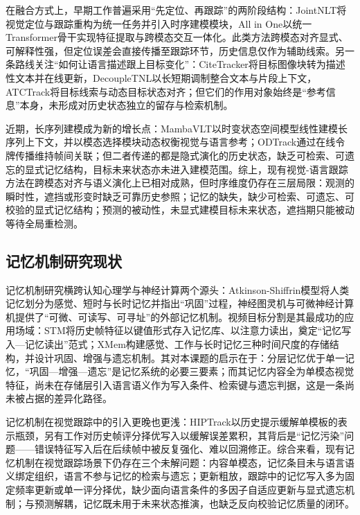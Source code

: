 在融合方式上，早期工作普遍采用“先定位、再跟踪”的两阶段结构：JointNLT\cite{zhou2023jointnlt}将视觉定位与跟踪重构为统一任务并引入时序建模模块，All in One\cite{zhang2023allinone}以统一Transformer骨干实现特征提取与跨模态交互一体化。此类方法跨模态对齐显式、可解释性强，但定位误差会直接传播至跟踪环节，历史信息仅作为辅助线索。另一条路线关注“如何让语言描述跟上目标变化”：CiteTracker\cite{li2023citetracker}将目标图像块转为描述性文本并在线更新，DecoupleTNL\cite{ma2023decouple}以长短期调制整合文本与片段上下文，ATCTrack\cite{feng2025atctrack}将目标线索与动态目标状态对齐；但它们的作用对象始终是“参考信息”本身，未形成对历史状态独立的留存与检索机制。

近期，长序列建模成为新的增长点：MambaVLT\cite{liu2025mambavlt}以时变状态空间模型线性建模长序列上下文，并以模态选择模块动态权衡视觉与语言参考；ODTrack\cite{zheng2024odtrack}通过在线令牌传播维持帧间关联；但二者传递的都是隐式演化的历史状态，缺乏可检索、可遗忘的显式记忆结构，目标未来状态亦未进入建模范围。综上，现有视觉-语言跟踪方法在跨模态对齐与语义演化上已相对成熟，但时序维度仍存在三层局限：观测的瞬时性，遮挡或形变时缺乏可靠历史参照；记忆的缺失，缺少可检索、可遗忘、可校验的显式记忆结构；预测的被动性，未显式建模目标未来状态，遮挡期只能被动等待全局重检测。

\subsection{记忆机制研究现状}

记忆机制研究横跨认知心理学与神经计算两个源头：Atkinson-Shiffrin模型将人类记忆划分为感觉、短时与长时记忆并指出“巩固”过程\cite{atkinson1968human}，神经图灵机与可微神经计算机提供了“可微、可读写、可寻址”的外部记忆机制\cite{graves2014ntm,graves2016hybrid}。视频目标分割是其最成功的应用场域：STM\cite{oh2019stm}将历史帧特征以键值形式存入记忆库、以注意力读出，奠定“记忆写入—记忆读出”范式；XMem\cite{cheng2022xmem}构建感觉、工作与长时记忆三种时间尺度的存储结构，并设计巩固、增强与遗忘机制。其对本课题的启示在于：分层记忆优于单一记忆，“巩固—增强—遗忘”是记忆系统的必要三要素；而其记忆内容全为单模态视觉特征，尚未在存储层引入语言语义作为写入条件、检索键与遗忘判据，这是一条尚未被占据的差异化路径。

记忆机制在视觉跟踪中的引入更晚也更浅：HIPTrack\cite{cai2024hiptrack}以历史提示缓解单模板的表示瓶颈，另有工作对历史帧评分择优写入以缓解误差累积\cite{zheng2025robust}，其背后是“记忆污染”问题——错误特征写入后在后续帧中被反复强化、难以回溯修正。综合来看，现有记忆机制在视觉跟踪场景下仍存在三个未解问题：内容单模态，记忆条目未与语言语义绑定组织，语言不参与记忆的检索与遗忘；更新粗放，跟踪中的记忆写入多为固定频率更新或单一评分择优，缺少面向语言条件的多因子自适应更新与显式遗忘机制；与预测解耦，记忆既未用于未来状态推演，也缺乏反向校验记忆质量的闭环。

